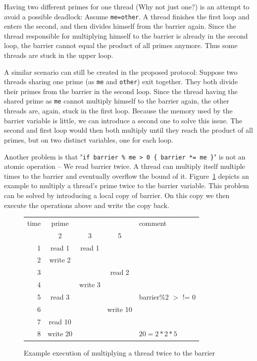 \documentclass[a4paper, 10pt]{article}
\begin{document}
Having two different primes for one thread (Why not just one?) is an attempt to avoid a possible deadlock: Assume \texttt{me=other}. A thread finishes the first loop and enters the second, and then divides himself from the barrier again. Since the thread responsible for multiplying himself to the barrier is already in the second loop, the barrier cannot equal the product of all primes anymore. Thus some threads are stuck in the upper loop.

A similar scenario can still be created in the proposed protocol: Suppose two threads sharing one prime (as \texttt{me} and \texttt{other}) exit together. They both divide their primes from the barrier in the second loop. Since the thread having the shared prime as \texttt{me} cannot multiply himself to the barrier again, the other threads are, again, stuck in the first loop. Because the memory used by the barrier variable is little, we can introduce a second one to solve this issue. The second and first loop would then both multiply until they reach the product of all primes, but on two distinct variables, one for each loop.

Another problem is that "\texttt{if~barrier~\%~me~>~0~\{~barrier~*=~me~\}}" is not an atomic operation -- We read barrier twice. A thread can multiply itself multiple times to the barrier and eventually overflow the bound of it. Figure~\ref{fig:deadlock1} depicts an example to multiply a thread's prime twice to the barrier variable. This problem can be solved by introducing a local copy of barrier. On this copy we then execute the operations above and write the copy back.
\begin{figure}[htbp]
	\centering
	\begin{tabular}{r | c c c | l}
		time & prime    &         &          & comment \\
			 & 2        & 3       & 5        &         \\
		\hline
		1    & read 1   & read 1  &          &         \\
		2    & write 2  &         &          &         \\
		3    &          &         & read 2   &         \\
		4    &          & write 3 &          &         \\
		5    & read 3   &         &          & barrier\%2 $>$ != 0 \\
		6    &          &         & write 10 &         \\
		7    & read 10  &         &          &         \\
		8    & write 20 &         &          & $20 = 2 * 2 * 5$ \\
	\end{tabular}
	\caption{Example execution of multiplying a thread twice to the barrier}
	\label{fig:deadlock1}
\end{figure}
\end{document}
